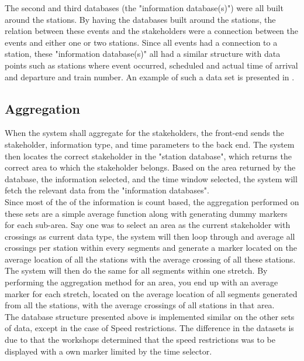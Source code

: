 The second and third databases (the "information database(s)") were all built
around the stations. By having the databases built around the stations, the 
relation between these events and the stakeholders were a connection between 
the events and either one or two stations. Since all events had a connection 
to a station, these "information database(s)" all had a similar structure with 
data points such as stations where event occurred, scheduled and actual time 
of arrival and departure and train number. An example of such a data set is 
presented in .


\subsection{Aggregation} %
\label{sub:back_end_aggregation}
When the system shall aggregate for the stakeholders, the front-end sends
the stakeholder, information type, and time parameters to the back end. 
The system then locates the correct stakeholder in the "station database",
which returns the correct area to which the stakeholder belongs. Based on the 
area returned by the database, the information selected, and the time window
selected, the system will fetch the relevant data from the "information 
databases". \\

Since most of the of the information is count based, the aggregation performed
on these sets are a simple average function along with generating dummy 
markers for each sub-area. Say one was to select an area as the current 
stakeholder with crossings as current data type, the system will then loop 
through and average all crossings per station within every segments and 
generate a marker located on the average location of all the stations with the 
average crossing of all these stations. The system will then do the same for 
all segments within one stretch. By performing the aggregation method for an 
area, you end up with an average marker for each stretch, located on the  
average location of all segments generated from all the stations, with the 
average crossings of all stations in that area.\\

The database structure presented above is implemented similar on the other 
sets of data, except in the case of Speed restrictions. The difference in the
datasets is due to that the workshops determined that the speed restrictions
was to be displayed with a own marker limited by the time selector.

